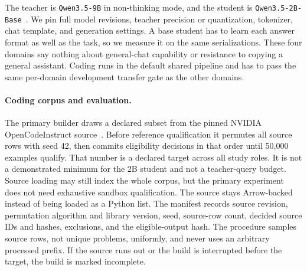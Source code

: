 \documentclass[journal]{IEEEtran}
\begin{document}
The teacher is \texttt{Qwen3.5-9B} in non-thinking mode, and the student is \texttt{Qwen3.5-2B-Base}~\cite{qwen2026qwen35}. We pin full model revisions, teacher precision or quantization, tokenizer, chat template, and generation settings. A base student has to learn each answer format as well as the task, so we measure it on the same serializations. These four domains say nothing about general-chat capability or resistance to copying a general assistant. Coding runs in the default shared pipeline and has to pass the same per-domain development transfer gate as the other domains.

\paragraph{Coding corpus and evaluation.} The primary builder draws a declared subset from the pinned NVIDIA OpenCodeInstruct source~\cite{ahmad2025opencodeinstruct,opencodeinstructdataset}. Before reference qualification it permutes all source rows with seed 42, then commits eligibility decisions in that order until 50,000 examples qualify. That number is a declared target across all study roles. It is not a demonstrated minimum for the 2B student and not a teacher-query budget. Source loading may still index the whole corpus, but the primary experiment does not need exhaustive sandbox qualification. The source stays Arrow-backed instead of being loaded as a Python list. The manifest records source revision, permutation algorithm and library version, seed, source-row count, decided source IDs and hashes, exclusions, and the eligible-output hash. The procedure samples source rows, not unique problems, uniformly, and never uses an arbitrary processed prefix. If the source runs out or the build is interrupted before the target, the build is marked incomplete.
\end{document}
